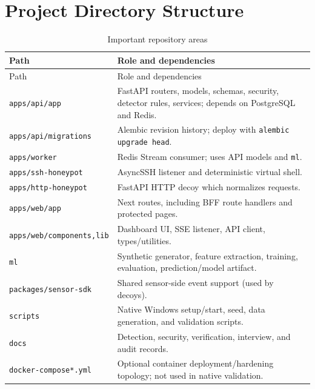 \documentclass[11pt,oneside]{book}
\begin{document}
\chapter{Project Directory Structure}
\begin{longtable}{p{43mm}p{100mm}}\caption{Important repository areas}\\\toprule Path & Role and dependencies\\\midrule\endfirsthead\toprule Path & Role and dependencies\\\midrule\endhead
\texttt{apps/api/app} & FastAPI routers, models, schemas, security, detector rules, services; depends on PostgreSQL and Redis.\\
\texttt{apps/api/migrations} & Alembic revision history; deploy with \texttt{alembic upgrade head}.\\
\texttt{apps/worker} & Redis Stream consumer; uses API models and \texttt{ml}.\\
\texttt{apps/ssh-honeypot} & AsyncSSH listener and deterministic virtual shell.\\
\texttt{apps/http-honeypot} & FastAPI HTTP decoy which normalizes requests.\\
\texttt{apps/web/app} & Next routes, including BFF route handlers and protected pages.\\
\texttt{apps/web/components,lib} & Dashboard UI, SSE listener, API client, types/utilities.\\
\texttt{ml} & Synthetic generator, feature extraction, training, evaluation, prediction/model artifact.\\
\texttt{packages/sensor-sdk} & Shared sensor-side event support (used by decoys).\\
\texttt{scripts} & Native Windows setup/start, seed, data generation, and validation scripts.\\
\texttt{docs} & Detection, security, verification, interview, and audit records.\\
\texttt{docker-compose*.yml} & Optional container deployment/hardening topology; not used in native validation.\\\bottomrule\end{longtable}
\end{document}
